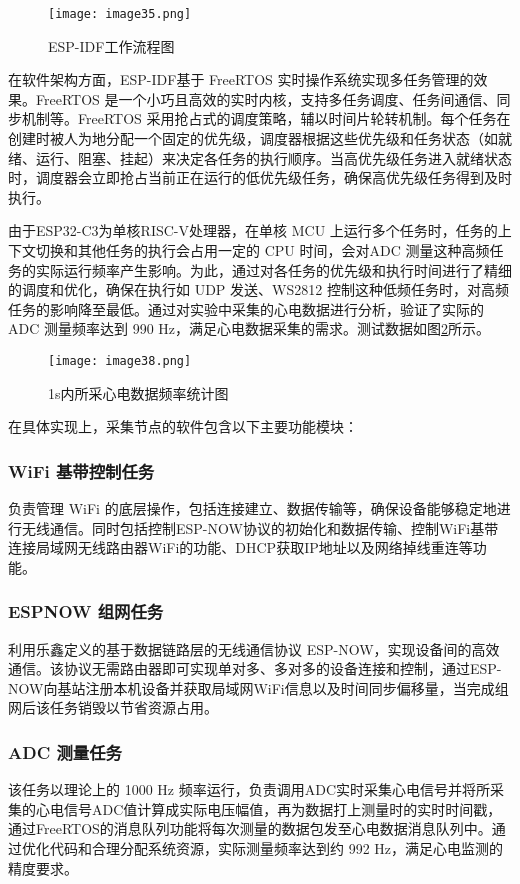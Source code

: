 \begin{figure}[H]
    \centering
    \texttt{[image: image35.png]}
    \caption{ESP-IDF工作流程图\cite{espressif2025espidf}}
    \label{F.ECG_image35}
\end{figure}

在软件架构方面，ESP-IDF基于 FreeRTOS 实时操作系统实现多任务管理的效果。FreeRTOS 是一个小巧且高效的实时内核，支持多任务调度、任务间通信、同步机制等。FreeRTOS 采用抢占式的调度策略，辅以时间片轮转机制。每个任务在创建时被人为地分配一个固定的优先级，调度器根据这些优先级和任务状态（如就绪、运行、阻塞、挂起）来决定各任务的执行顺序。当高优先级任务进入就绪状态时，调度器会立即抢占当前正在运行的低优先级任务，确保高优先级任务得到及时执行。

由于ESP32-C3为单核RISC-V处理器，在单核 MCU 上运行多个任务时，任务的上下文切换和其他任务的执行会占用一定的 CPU 时间，会对ADC 测量这种高频任务的实际运行频率产生影响。为此，通过对各任务的优先级和执行时间进行了精细的调度和优化，确保在执行如 UDP 发送、WS2812 控制这种低频任务时，对高频任务的影响降至最低。通过对实验中采集的心电数据进行分析，验证了实际的 ADC 测量频率达到 990 Hz，满足心电数据采集的需求。测试数据如图\ref{F.ECG_image38}所示。

\begin{figure}[htb]
    \centering
    \texttt{[image: image38.png]}
    \caption{1s内所采心电数据频率统计图}
    \label{F.ECG_image38}
\end{figure}

在具体实现上，采集节点的软件包含以下主要功能模块：

\subsubsection{WiFi 基带控制任务}负责管理 WiFi 的底层操作，包括连接建立、数据传输等，确保设备能够稳定地进行无线通信。同时包括控制ESP-NOW协议的初始化和数据传输、控制WiFi基带连接局域网无线路由器WiFi的功能、DHCP获取IP地址以及网络掉线重连等功能。

\subsubsection{ESPNOW 组网任务}利用乐鑫定义的基于数据链路层的无线通信协议 ESP-NOW，实现设备间的高效通信。该协议无需路由器即可实现单对多、多对多的设备连接和控制，通过ESP-NOW向基站注册本机设备并获取局域网WiFi信息以及时间同步偏移量，当完成组网后该任务销毁以节省资源占用。

\subsubsection{ADC 测量任务}该任务以理论上的 1000 Hz 频率运行，负责调用ADC实时采集心电信号并将所采集的心电信号ADC值计算成实际电压幅值，再为数据打上测量时的实时时间戳，通过FreeRTOS的消息队列功能将每次测量的数据包发至心电数据消息队列中。通过优化代码和合理分配系统资源，实际测量频率达到约 992 Hz，满足心电监测的精度要求。

